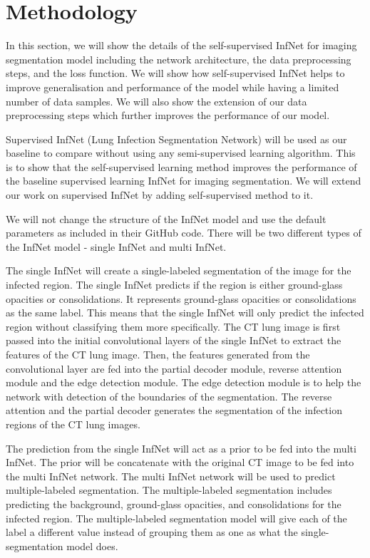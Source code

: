 \section{Methodology}


In this section, we will show the details of the self-supervised InfNet for imaging segmentation model including the network architecture, the data preprocessing steps, and the loss function. We will show how self-supervised InfNet helps to improve generalisation and performance of the model while having a limited number of data samples. We will also show the extension of our data preprocessing steps which further improves the performance of our model.

Supervised InfNet (Lung Infection Segmentation Network) will be used as our baseline to compare without using any semi-supervised learning algorithm. This is to show that the self-supervised learning method  improves the performance of the baseline supervised learning InfNet for imaging segmentation. We will extend our work on supervised InfNet by adding self-supervised method to it.

We will not change the structure of the InfNet model and use the default parameters as included in their GitHub code. There will be two different types of the InfNet model - single InfNet and multi InfNet. 

The single InfNet will create a single-labeled segmentation of the image for the infected region. The single InfNet predicts if the region is either ground-glass opacities or consolidations. It represents ground-glass opacities or consolidations as the same label. This means that the single InfNet will only predict the infected region without classifying them more specifically.  The CT lung image is first passed into the initial convolutional layers of the single InfNet to extract the features of the CT lung image. Then, the features generated from the convolutional layer are fed into the partial decoder module, reverse attention module and the edge detection module. The edge detection module is to help the network with detection of the boundaries of the segmentation. The reverse attention and the partial decoder generates the segmentation of the infection regions of the CT lung images.

The prediction from the single InfNet will act as a prior to be fed into the multi InfNet. The prior will be concatenate with the original CT image to be fed into the multi InfNet network. The multi InfNet network will be used to predict multiple-labeled segmentation. The multiple-labeled segmentation includes predicting the background, ground-glass opacities, and consolidations for the infected region. The multiple-labeled segmentation model will give each of the label a different value instead of grouping them as one as what the single-segmentation model does. 

